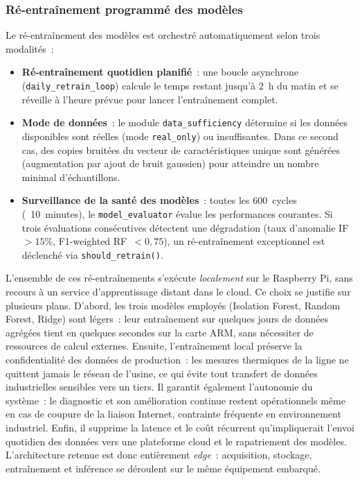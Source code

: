 \subsubsection{Ré-entraînement programmé des modèles}

Le ré-entraînement des modèles est orchestré automatiquement selon trois modalités~:

\begin{itemize}
  \item \textbf{Ré-entraînement quotidien planifié}~: une boucle asynchrone (\texttt{daily\_retrain\_loop}) calcule le temps restant jusqu'à 2~h du matin et se réveille à l'heure prévue pour lancer l'entraînement complet.
  \item \textbf{Mode de données}~: le module \texttt{data\_sufficiency} détermine si les données disponibles sont réelles (mode \texttt{real\_only}) ou insuffisantes. Dans ce second cas, des copies bruitées du vecteur de caractéristiques unique sont générées (augmentation par ajout de bruit gaussien) pour atteindre un nombre minimal d'échantillons.
  \item \textbf{Surveillance de la santé des modèles}~: toutes les 600~cycles (~10~minutes), le \texttt{model\_evaluator} évalue les performances courantes. Si trois évaluations consécutives détectent une dégradation (taux d'anomalie IF~\(>15\%\), F1-weighted RF~\(<0,75\)), un ré-entraînement exceptionnel est déclenché via \texttt{should\_retrain()}.
\end{itemize}

L'ensemble de ces ré-entraînements s'exécute \emph{localement} sur le Raspberry Pi, sans recours à un service d'apprentissage distant dans le cloud. Ce choix se justifie sur plusieurs plans. D'abord, les trois modèles employés (Isolation Forest, Random Forest, Ridge) sont légers~: leur entraînement sur quelques jours de données agrégées tient en quelques secondes sur la carte ARM, sans nécessiter de ressources de calcul externes. Ensuite, l'entraînement local préserve la confidentialité des données de production~: les mesures thermiques de la ligne ne quittent jamais le réseau de l'usine, ce qui évite tout transfert de données industrielles sensibles vers un tiers. Il garantit également l'autonomie du système~: le diagnostic et son amélioration continue restent opérationnels même en cas de coupure de la liaison Internet, contrainte fréquente en environnement industriel. Enfin, il supprime la latence et le coût récurrent qu'impliquerait l'envoi quotidien des données vers une plateforme cloud et le rapatriement des modèles. L'architecture retenue est donc entièrement \emph{edge}~: acquisition, stockage, entraînement et inférence se déroulent sur le même équipement embarqué.

